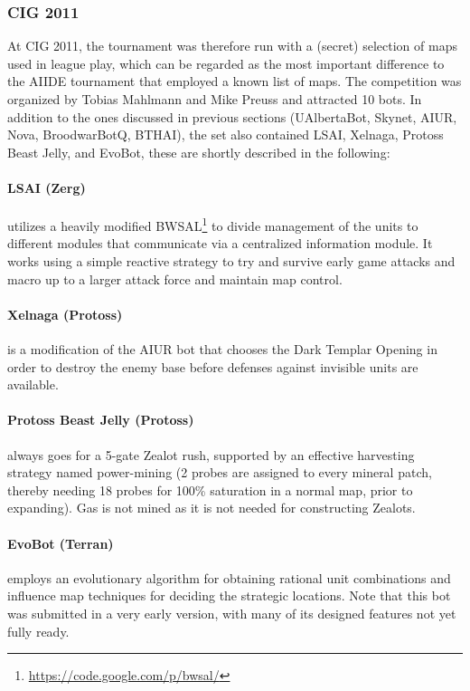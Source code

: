 \documentclass{llncs}
\begin{document}
\subsubsection{CIG 2011}

At CIG 2011, the tournament was therefore run with a (secret) selection
of maps used in league play, which can be regarded as the most important
difference to the AIIDE tournament that employed a known list of maps.
The competition was organized by Tobias Mahlmann and Mike
Preuss and attracted 10 bots. In addition to the ones discussed in previous
sections (UAlbertaBot, Skynet, AIUR, Nova, BroodwarBotQ, BTHAI), 
the set also contained LSAI, Xelnaga, Protoss Beast Jelly, and EvoBot,
these are shortly described in the following:

\paragraph*{LSAI (Zerg)} utilizes a heavily modified BWSAL\footnote{\url{https://code.google.com/p/bwsal/}} to divide management
 of the units to different modules that communicate via a centralized information
 module. It works using a simple reactive strategy to try and survive early game
 attacks and macro up to a larger attack force and maintain map control.
 
\paragraph*{Xelnaga (Protoss)} is a modification of the AIUR bot that chooses the 
Dark Templar Opening in order to destroy the enemy base before defenses against
invisible units are available. 

\paragraph*{Protoss Beast Jelly (Protoss)}
always goes for a 5-gate Zealot rush, supported by an effective harvesting 
strategy named power-mining (2 probes are assigned to every mineral patch,
thereby needing 18 probes for 100\% saturation in a normal map, prior
to expanding). Gas is not mined as it is not needed for constructing Zealots.

\paragraph*{EvoBot (Terran)} employs an evolutionary algorithm for obtaining rational
 unit combinations and influence map techniques for deciding the strategic locations. Note
 that this bot was submitted in a very early version, with many of its designed features not
 yet fully ready. 
\end{document}
